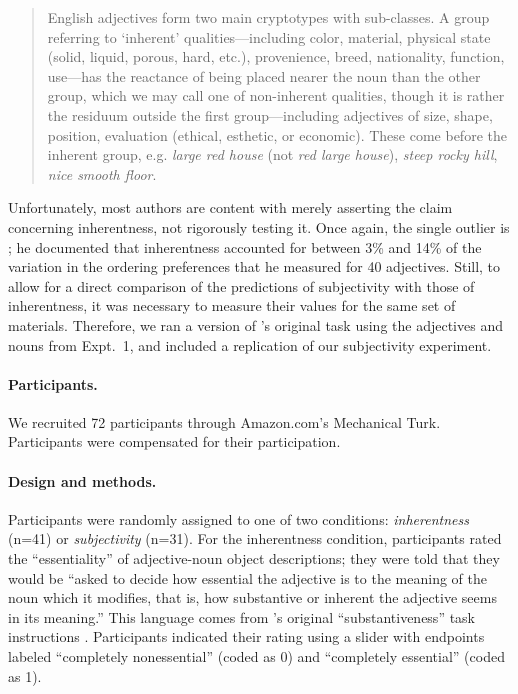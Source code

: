 \documentclass[12pt]{article}
\newcommand{\jd}[1]{\textcolor{red}{[jd: #1]}}
\begin{document}
\begin{quotation}
English adjectives form two main cryptotypes with sub-classes. A group referring to `inherent' qualities---including color, material, physical state (solid, liquid, porous, hard, etc.), provenience, breed, nationality, function, use---has the reactance of being placed nearer the noun than the other group, which we may call one of non-inherent qualities, though it is rather the residuum outside the first group---including adjectives of size, shape, position, evaluation (ethical, esthetic, or economic). These come before the inherent group, e.g. \emph{large red house} (not \emph{red large house}), \emph{steep rocky hill}, \emph{nice smooth floor}.
\end{quotation}

Unfortunately, most authors are content with merely asserting the claim concerning inherentness, not rigorously testing it. Once again, the single outlier is \cite{martin1969}; he documented that inherentness accounted for between 3\% and 14\% of the variation in the ordering preferences that he measured for 40 adjectives.  Still, to allow for a direct comparison of the predictions of subjectivity with those of inherentness, it was necessary to measure their values for the same set of materials. Therefore, we ran a version of \citeauthor{martin1969}'s original task using the adjectives and nouns from Expt.~1, and included a replication of our subjectivity experiment.%

\paragraph{Participants.} We recruited 72 participants through Amazon.com's Mechanical Turk. Participants were compensated for their participation.

\paragraph{Design and methods.} Participants were randomly assigned to one of two conditions: \emph{inherentness} (n=41) or \emph{subjectivity} (n=31). For the inherentness condition, participants rated the ``essentiality'' of adjective-noun object descriptions; they were told that they would be ``asked to decide how essential the adjective is to the meaning of the noun which it modifies, that is, how substantive or inherent the adjective seems in its meaning.'' This language comes from \citeauthor{martin1969}'s original ``substantiveness'' task instructions \citep[Expt.~VII]{martin1969}. Participants indicated their rating using a slider with endpoints labeled ``completely nonessential'' (coded as 0) and ``completely essential'' (coded as 1).
\end{document}
